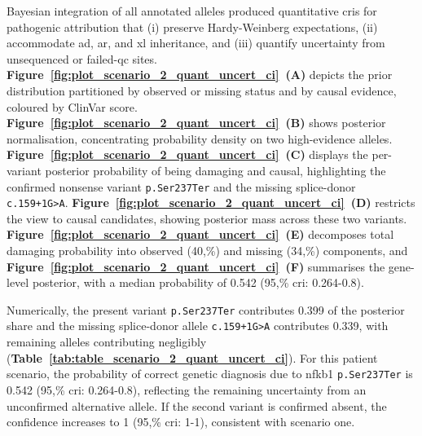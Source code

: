 Bayesian integration of all annotated alleles produced quantitative \ac{cri}s for pathogenic attribution that (i) preserve Hardy-Weinberg expectations, (ii) accommodate \ac{ad}, \ac{ar}, and \ac{xl} inheritance, and (iii) quantify uncertainty from unsequenced or failed-\ac{qc} sites.
\textbf{Figure~\ref{fig:plot_scenario_2_quant_uncert_ci}~(A)} depicts the prior distribution partitioned by observed or missing status and by causal evidence, coloured by ClinVar score. \textbf{Figure~\ref{fig:plot_scenario_2_quant_uncert_ci}~(B)} shows posterior normalisation, concentrating probability density on two high-evidence alleles. \textbf{Figure~\ref{fig:plot_scenario_2_quant_uncert_ci}~(C)} displays the per-variant posterior probability of being damaging and causal, highlighting the confirmed nonsense variant \texttt{p.Ser237Ter} and the missing splice-donor \texttt{c.159+1G{\small\textgreater}A}. \textbf{Figure~\ref{fig:plot_scenario_2_quant_uncert_ci}~(D)} restricts the view to causal candidates, showing posterior mass across these two variants. \textbf{Figure~\ref{fig:plot_scenario_2_quant_uncert_ci}~(E)} decomposes total damaging probability into observed (40,\%) and missing (34,\%) components, and \textbf{Figure~\ref{fig:plot_scenario_2_quant_uncert_ci}~(F)} summarises the gene-level posterior, with a median probability of 0.542 (95,\% \ac{cri}: 0.264-0.8).

Numerically, the present variant \texttt{p.Ser237Ter} contributes 0.399 of the posterior share and the missing splice-donor allele \texttt{c.159+1G{\small\textgreater}A} contributes 0.339, with remaining alleles contributing negligibly (\textbf{Table~\ref{tab:table_scenario_2_quant_uncert_ci}}). For this patient scenario, the probability of correct genetic diagnosis due to \ac{nfkb1} \texttt{p.Ser237Ter} is 0.542 (95,\% \ac{cri}: 0.264-0.8), reflecting the remaining uncertainty from an unconfirmed alternative allele. If the second variant is confirmed absent, the confidence increases to 1 (95,\% \ac{cri}: 1-1), consistent with scenario one.

% 

